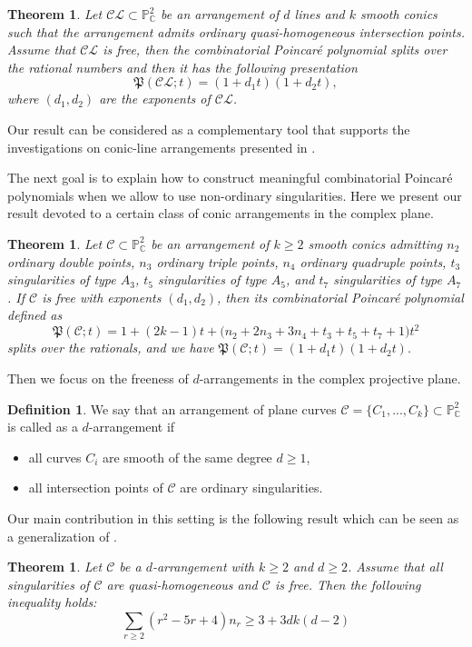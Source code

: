 \documentclass[12pt]{article}
\theoremstyle{plain}
\newtheorem{theorem}[thm]{Theorem}
\theoremstyle{definition}
\newtheorem{definition}[thm]{Definition}
\begin{document}
\begin{theorem}
\label{main}
Let $\mathcal{CL} \subset \mathbb{P}^{2}_{\mathbb{C}}$ be an arrangement of $d$ lines and $k$ smooth conics such that the arrangement admits ordinary quasi-homogeneous intersection points. Assume that $\mathcal{CL}$ is free, then the combinatorial Poincar\'e polynomial splits over the rational numbers and then it has the following presentation
$$\mathfrak{P}(\mathcal{CL};t) = (1+d_{1}t)(1+d_{2}t),$$
where $(d_{1},d_{2})$ are the exponents of $\mathcal{CL}$.
\end{theorem}
Our result can be considered as a complementary tool that supports the investigations on conic-line arrangements presented in \cite{ST}.

The next goal is to explain how to construct meaningful combinatorial Poincar\'e polynomials when we allow to use non-ordinary singularities. Here we present our result devoted to a certain class of conic arrangements in the complex plane.

\begin{theorem}
\label{conics}
 Let $\mathcal{C} \subset \mathbb{P}^{2}_{\mathbb{C}}$ be an arrangement of $k\geq 2$ smooth conics admitting $n_{2}$ ordinary double points, $n_{3}$ ordinary triple points, $n_{4}$ ordinary quadruple points, $t_{3}$ singularities of type $A_{3}$, $t_{5}$ singularities of type $A_{5}$, and $t_{7}$ singularities of type $A_{7}$. If $\mathcal{C}$ is free with exponents $(d_{1},d_{2})$, then its combinatorial Poincar\'e polynomial defined as 
 $$\mathfrak{P}(\mathcal{C};t) = 1 + (2k-1)t + \bigg(n_{2} + 2n_{3} + 3n_{4} +t_{3} + t_{5} + t_{7} + 1\bigg)t^{2}$$
 splits over the rationals, and we have $\mathfrak{P}(\mathcal{C};t) = (1+d_{1}t)(1+d_{2}t).$
\end{theorem}

Then we focus on the freeness of $d$-arrangements in the complex projective plane.
\begin{definition}
We say that an arrangement of plane curves $\mathcal{C} = \{C_{1}, ...,C_{k}\}\subset \mathbb{P}^{2}_{\mathbb{C}}$ is called as a $d$-arrangement if
\begin{itemize}
\item all curves $C_{i}$ are smooth of the same degree $d\geq 1$,
\item all intersection points of $\mathcal{C}$ are ordinary singularities.
\end{itemize}
\end{definition}
Our main contribution in this setting is the following result which can be seen as a generalization of \cite[Theorem 5.2]{PP2023}.
\begin{theorem}
\label{dd}
Let $\mathcal{C}$ be a $d$-arrangement with $k \geq 2$ and $d\geq 2$. Assume that all singularities of $\mathcal{C}$ are quasi-homogeneous and $\mathcal{C}$ is free. Then the following inequality holds:
\begin{equation}
    \sum_{r\geq 2}(r^{2}-5r+4) n_{r} \geq 3 + 3dk(d-2)
\end{equation}
\end{theorem}
\end{document}
